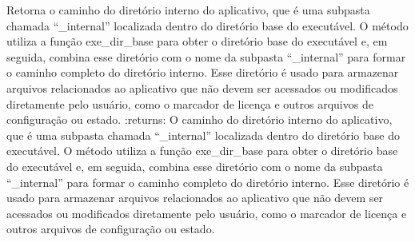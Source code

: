 \documentclass[letterpaper,10pt,english]{sphinxmanual}
\begin{document}
\begin{fulllineitems}
\label{\detokenize{api/simple_lock:simple_lock.internal_dir}}
\pysigstartsignatures
\pysiglinewithargsret
{}
{}
{}
\pysigstopsignatures
\sphinxAtStartPar
Retorna o caminho do diretório interno do aplicativo, que é uma subpasta chamada “\_internal” localizada dentro do diretório base do executável. O método utiliza a função exe\_dir\_base para obter o diretório base do executável e, em seguida, combina esse diretório com o nome da subpasta “\_internal” para formar o caminho completo do diretório interno. Esse diretório é usado para armazenar arquivos relacionados ao aplicativo que não devem ser acessados ou modificados diretamente pelo usuário, como o marcador de licença e outros arquivos de configuração ou estado.
:returns: O caminho do diretório interno do aplicativo, que é uma subpasta chamada “\_internal” localizada dentro do diretório base do executável. O método utiliza a função exe\_dir\_base para obter o diretório base do executável e, em seguida, combina esse diretório com o nome da subpasta “\_internal” para formar o caminho completo do diretório interno. Esse diretório é usado para armazenar arquivos relacionados ao aplicativo que não devem ser acessados ou modificados diretamente pelo usuário, como o marcador de licença e outros arquivos de configuração ou estado.
\begin{quote}\begin{description}
\sphinxAtStartPar
{}

\end{description}\end{quote}

\end{fulllineitems}

\end{document}
